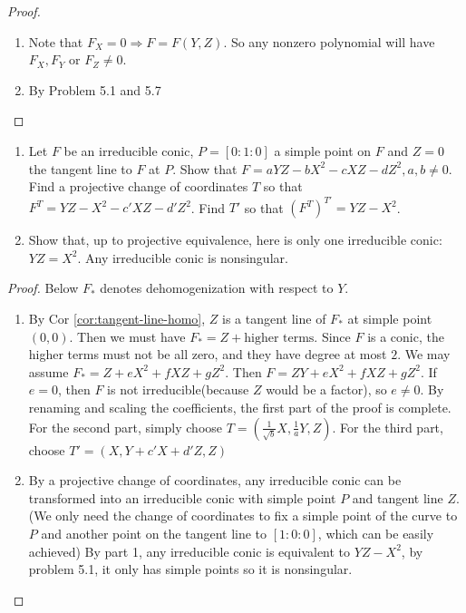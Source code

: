 \documentclass{solution}
\begin{document}
\begin{proof}
    \begin{enumerate}
        \item Note that $F_X = 0 \Rightarrow F = F(Y, Z)$. So any nonzero polynomial will have $F_X, F_Y$ or $F_Z \ne 0$.
        \item By Problem 5.1 and 5.7
    \end{enumerate}
\end{proof}

\begin{problem}{5.9}
    \begin{enumerate}
        \item Let $F$ be an irreducible conic, $P = [0:1:0]$ a simple point on $F$ and $Z = 0$ the tangent line to $F$ at $P$. Show that $F = aYZ - bX^2 - cXZ - dZ^2, a, b \ne 0$. Find a projective change of coordinates $T$ so that $F^T = YZ - X^2 - c'XZ - d'Z^2$. Find $T'$ so that $(F^T)^{T'} = YZ - X^2$.
        \item Show that, up to projective equivalence, here is only one irreducible conic: $YZ = X^2$. Any irreducible conic is nonsingular.
    \end{enumerate}
\end{problem}

\begin{proof}
    Below $F_*$ denotes dehomogenization with respect to $Y$.

    \begin{enumerate}
        \item By Cor \ref{cor:tangent-line-homo}, $Z$ is a tangent line of $F_*$ at simple point $(0, 0)$. Then we must have $F_* = Z + \text{higher terms}$. Since $F$ is a conic, the higher terms must not be all zero, and they have degree at most $2$. We may assume $F_* = Z + eX^2 + fXZ + gZ^2$. Then $F = ZY + eX^2 + fXZ + gZ^2$. If $e = 0$, then $F$ is not irreducible(because $Z$ would be a factor), so $e \ne 0$. By renaming and scaling the coefficients, the first part of the proof is complete. For the second part, simply choose $T = (\frac{1}{\sqrt{b}}X, \frac{1}{a}Y, Z)$. For the third part, choose $T' = (X, Y + c'X + d'Z, Z)$
        \item By a projective change of coordinates, any irreducible conic can be transformed into an irreducible conic with simple point $P$ and tangent line $Z$. (We only need the change of coordinates to fix a simple point of the curve to $P$ and another point on the tangent line to $[1:0:0]$, which can be easily achieved) By part 1, any irreducible conic is equivalent to $YZ - X^2$, by problem 5.1, it only has simple points so it is nonsingular.
    \end{enumerate}
\end{proof}
\end{document}
